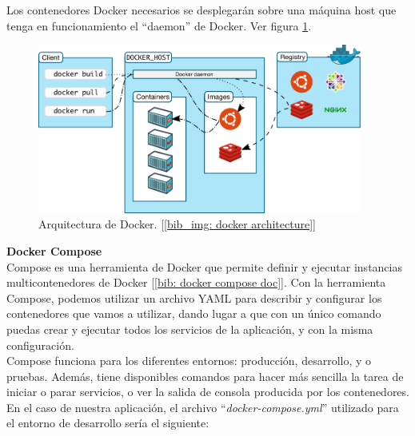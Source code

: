 \documentclass[a4paper, oneside, 12pt]{book}
\begin{document}
	\noindent Los contenedores Docker necesarios se desplegarán sobre una máquina host que tenga en funcionamiento el ``daemon'' de Docker. Ver figura \ref{img: docker arch}.
	
	\begin{figure}[h!]
		\begin{center}
			\includegraphics[width=0.95\textwidth]{img/architecture-docker.png}
			\caption{Arquitectura de Docker. [\ref{bib_img: docker architecture}]}
			\label{img: docker arch}
		\end{center}
	\end{figure}

	\pagebreak
	
	\noindent \textbf{\large Docker Compose} \\
	
	\noindent Compose es una herramienta de Docker que permite definir y ejecutar instancias multicontenedores de Docker [\ref{bib: docker compose doc}]. Con la herramienta Compose, podemos utilizar un archivo YAML para describir y configurar los contenedores que vamos a utilizar, dando lugar a que con un único comando puedas crear y ejecutar todos los servicios de la aplicación, y con la misma configuración. \\
	
	\noindent Compose funciona para los diferentes entornos: producción, desarrollo, y o pruebas. Además, tiene disponibles comandos para hacer más sencilla la tarea de iniciar o parar servicios, o ver la salida de consola producida por los contenedores. \\
	
	\noindent En el caso de nuestra aplicación, el archivo ``\textit{docker-compose.yml}'' utilizado para el entorno de desarrollo sería el siguiente:
	
\end{document}
